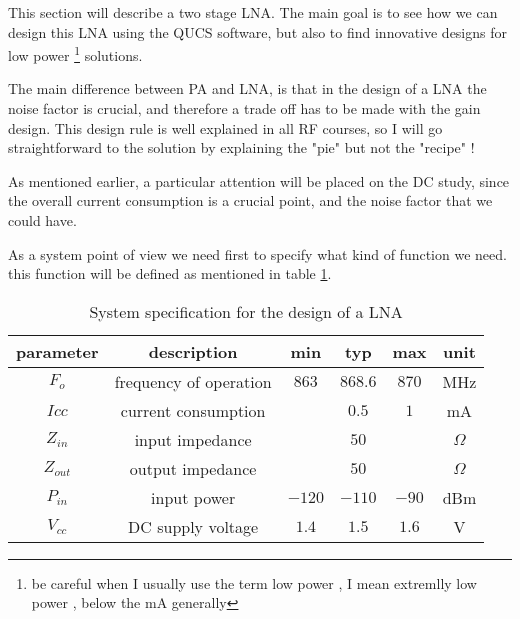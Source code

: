 %
%
%
%

This section will describe a two stage LNA. The main goal is to see how we can design this LNA using the QUCS software, but also to find innovative designs for low power \footnote{be careful when I usually use the term low power , I mean extremlly low power , below the mA generally} solutions.

\bigskip

The main difference between PA and LNA, is that in the design of a LNA the noise factor is crucial, and therefore a trade off has to be made with the gain design. This design rule is well explained in all RF courses, so I will go straightforward to the solution by explaining the "pie" but not the "recipe" !

\bigskip 

As mentioned earlier, a particular attention will be placed on the DC study, since the overall current consumption is a crucial point, and the noise factor that we could have.


As a system point of view we need first to specify what kind of function we need. this function will be defined as mentioned in table \ref{design:lna:systemSpecification}.


\begin{table}[htp]
\caption{System specification for the design of a LNA}
\begin{center}
\begin{tabular}{|c|c|c|c|c|c|} \hline
parameter & description 					& min   & typ     & max   & unit \\ \hline \hline
$F_o$     & frequency of operation		& $863$ & $868.6$ & $870$ & MHz \\
$Icc$ 	   & current consumption        &       &    $0.5$     & $1$    & mA \\ \hline
$Z_{in}$  & input impedance            &       & $50$    &        & $\Omega$ \\
$Z_{out}$  & output impedance            &       & $50$    &        & $\Omega$ \\ \hline
$P_{in}$   & input power                &   $-120$ & $-110$ & $-90$ & dBm \\
$V_{cc}$   & DC supply voltage                &   $1.4$ & $1.5$ & $1.6$ & V \\ \hline
\end{tabular}
\end{center}
\label{design:lna:systemSpecification}
\end{table}


